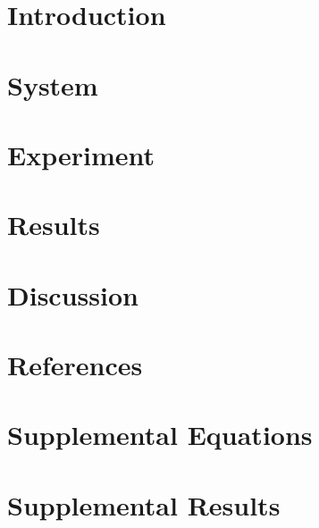 \documentclass[review,3p,authoryear]{elsarticle}
\begin{document}

\section{Introduction}\label{s:intro}

\section{System}\label{s:system}

\section{Experiment}\label{s:exp}

\section{Results}\label{s:results}

\section{Discussion}\label{s:discussion}

\clearpage

\clearpage
\section*{References}

\clearpage
\initappendix
\section{Supplemental Equations}\label{a:eqs}

\clearpage
\section{Supplemental Results}\label{a:results}

\clearpage
\end{document}
